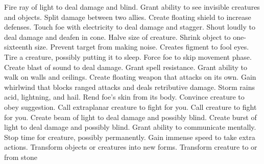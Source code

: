     {Fire ray of light to deal damage and blind.}
    {Grant ability to see invisible creatures and objects.}
    {Split damage between two allies.}
    {Create floating shield to increase defenses.}
    {Touch foe with electricity to deal damage and stagger.}
    {Shout loudly to deal damage and deafen in cone.}
    {Halve size of creature.}
    {Shrink object to one-sixteenth size.}
    {Prevent target from making noise.}
    {Creates figment to fool eyes.}
    {Tire a creature, possibly putting it to sleep.}
    {Force foe to skip movement phase.}
    {Create blast of sound to deal damage.}
    {Grant spell resistance.}
    {Grant ability to walk on walls and ceilings.}
    {Create floating weapon that attacks on its own.}
    {Gain whirlwind that blocks ranged attacks and deals retributive damage.}
    {Storm rains acid, lightning, and hail.}
    {Rend foe's skin from its body.}
    {Convince creature to obey suggestion.}
    {Call extraplanar creature to fight for you.}
    {Call creature to fight for you.}
    {Create beam of light to deal damage and possibly blind.}
    {Create burst of light to deal damage and possibly blind.}
    {Grant ability to communicate mentally.}
    {Stop time for creature, possibly permanently.}
    {Gain immense speed to take extra actions.}
    {Transform objects or creatures into new forms.}
    {Transform creature to or from stone}
